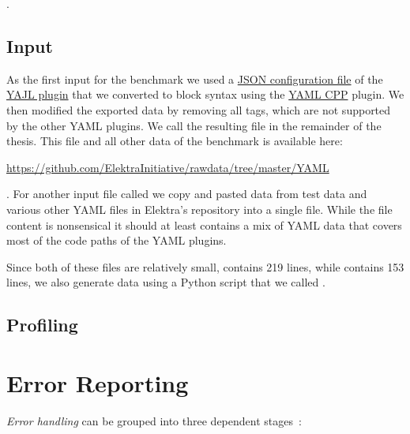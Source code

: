 .

\subsection{Input}

As the first input for the benchmark we used a \href{https://master.libelektra.org/src/plugins/yajl/yajl/keyframes_complex.json}{JSON configuration file} of the \href{https://www.libelektra.org/plugins/yajl}{YAJL plugin} that we converted to block syntax using the \href{https://www.libelektra.org/plugins/yamlcpp}{YAML CPP} plugin. We then modified the exported data by removing all  tags, which are not supported by the other YAML plugins. We call the resulting file \href{https://github.com/ElektraInitiative/rawdata/tree/master/YAML/keyframes.yaml}{} in the remainder of the thesis. This file and all other data of the benchmark is available here:

\begin{leftbar}
  \url{https://github.com/ElektraInitiative/rawdata/tree/master/YAML}
\end{leftbar}

. For another input file called \href{https://github.com/ElektraInitiative/rawdata/tree/master/YAML/combined.yaml}{} we copy and pasted data from test data and various other YAML files in Elektra’s repository into a single file. While the file content is nonsensical it should at least contains a mix of YAML data that covers most of the code paths of the YAML plugins.

Since both of these files are relatively small,\href{https://github.com/ElektraInitiative/rawdata/tree/master/YAML/keyframes.yaml}{} contains 219 lines, while \href{https://github.com/ElektraInitiative/rawdata/tree/master/YAML/combined.yaml}{} contains 153 lines, we also generate data using a Python script that we called \href{https://master.libelektra.org/scripts/generate-yaml}{}.

\subsection{Profiling}

\section{Error Reporting}

\emph{Error handling} can be grouped into three dependent stages~\cite{ruefenacht2016error}:


